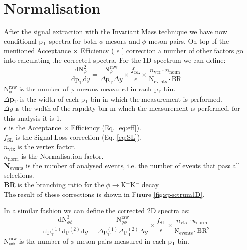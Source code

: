\section{Normalisation}
\label{sec:Normalisation}
After the signal extraction with the Invariant Mass technique we have now conditional p$_{\text{T}}$ spectra for both $\phi$ mesons and $\phi$-meson pairs. On top of the mentioned Acceptance $\times$ Efficiency ( $\epsilon$ ) correction a number of other factors go into calculating the corrected spectra. For the 1D spectrum we can define:
\begin{equation}
\frac{\text{dN}^2_{\phi}}{\text{dp}_{\text{T}}\text{d}y} = \frac{\text{N}_{\phi}^{\text{raw}}}{\Delta\text{p}_{\text{T}}\Delta y} \times \frac{f_{\text{SL}}}{\epsilon} \times \frac{n_{\text{vtx}}\cdot n_{\text{norm}}}{\text{N}_{\text{events}}\cdot \text{BR}}
\label{eq:1Dcorr}
\end{equation}
\textbf{$\text{N}_{\phi}^{\text{raw}}$} is the number of $\phi$ mesons measured in each p$_{\text{T}}$ bin.\\
\textbf{$\Delta$p$_{\text{T}}$} is the width of each p$_{\text{T}}$ bin in which the measurement is performed.\\
\textbf{$\Delta y$} is the width of the rapidity bin in which the measurement is performed, for this analysis it is 1.\\
\textbf{$\epsilon$} is the Acceptance $\times$ Efficiency (Eq. \ref{eq:eff}).\\
\textbf{$f_{\text{SL}}$} is the Signal Loss correction (Eq. \ref{eq:SL}).\\
\textbf{$n_{\text{vtx}}$} is the vertex factor.\\
\textbf{$n_{\text{norm}}$} is the Normalisation factor.\\
\textbf{N$_{\text{events}}$} is the number of analysed events, i.e. the number of events that pass all selections.\\
\textbf{BR} is the branching ratio for the $\phi \to$K$^+$K$^-$ decay.\\
\indent The result of these corrections is shown in Figure \ref{fig:spectrum1D}.

\indent In a similar fashion we can define the corrected 2D spectra as:
\begin{equation}
\frac{\text{dN}^3_{\phi\phi}}{\text{dp}^{(1)}_{\text{T}}\text{dp}^{(2)}_{\text{T}}\text{d}y} = \frac{\text{N}_{\phi\phi}^{\text{raw}}}{\Delta\text{p}^{(1)}_{\text{T}}\Delta\text{p}^{(2)}_{\text{T}}\Delta y} \times \frac{f_{\text{SL}}}{\epsilon} \times \frac{n_{\text{vtx}}\cdot n_{\text{norm}}}{\text{N}_{\text{events}}\cdot \text{BR}^2}
\label{eq:2Dcorr}
\end{equation}
\textbf{$\text{N}_{\phi\phi}^{\text{raw}}$} is the number of $\phi$-meson pairs measured in each p$_{\text{T}}$ bin.\\